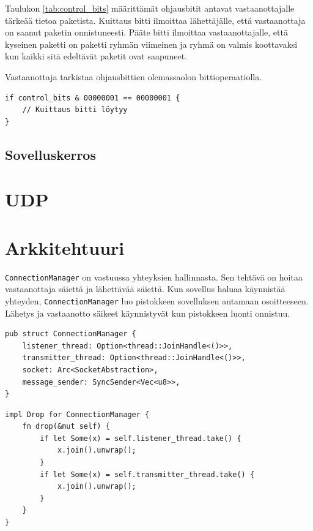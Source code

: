 \documentclass[a4paper,12pt]{article}
\begin{document}
    Taulukon \ref{tab:control_bits} määrittämät ohjausbitit antavat vastaanottajalle tärkeää tietoa paketista. Kuittaus bitti ilmoittaa lähettäjälle, että vastaanottaja on saanut paketin onnistuneesti. Pääte bitti ilmoittaa vastaanottajalle, että kyseinen paketti on paketti ryhmän viimeinen ja ryhmä on valmis koottavaksi kun kaikki sitä edeltävät paketit ovat saapuneet. \par
    Vastaanottaja tarkistaa ohjausbittien olemassaolon bittioperaatiolla. 
\begin{lstlisting}[caption={Kuittasbitin tarkistus ohjausbiteistä}, label={lst:ack_check}]
if control_bits & 00000001 == 00000001 {
    // Kuittaus bitti löytyy
}
\end{lstlisting}
    


    
    \subsection{Sovelluskerros}\label{subsec:sovelluskerros}
    \blindtext


    \section{UDP}\label{sec:udp}
    \blindtext


    \section{Arkkitehtuuri}\label{sec:arkkitehtuuri} 
    \architecture

     \lstinline{ConnectionManager} on vastuussa yhteyksien hallinnasta. Sen tehtävä on 
    hoitaa vastaanottaja säiettä ja lähettävää säiettä. Kun sovellus haluaa käynnistää yhteyden, 
    \lstinline{ConnectionManager} luo pistokkeen sovelluksen antamaan osoitteeseen. 
    Lähetys ja vastaanotto säikeet käynnistyvät kun pistokkeen luonti onnistuu. 
    \par
    \begin{lstlisting}[caption={ConnectionManager rakenne}, label={lst:connectionmanager}]
pub struct ConnectionManager {
    listener_thread: Option<thread::JoinHandle<()>>,
    transmitter_thread: Option<thread::JoinHandle<()>>,
    socket: Arc<SocketAbstraction>,
    message_sender: SyncSender<Vec<u8>>,
}\end{lstlisting}

\begin{lstlisting}[caption={Drop ominaisuuden toteutus ConnectionManager:ille}, label={lst:connectionmanager_drop}]
impl Drop for ConnectionManager {
    fn drop(&mut self) {
        if let Some(x) = self.listener_thread.take() {
            x.join().unwrap();
        }
        if let Some(x) = self.transmitter_thread.take() {
            x.join().unwrap();
        }
    }
}
\end{lstlisting}
\end{document}
